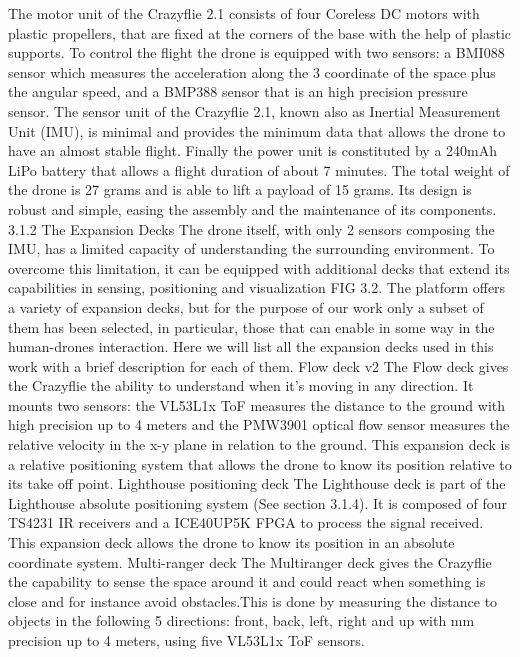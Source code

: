 The motor unit of the Crazyflie 2.1 consists of four Coreless DC motors with plastic propellers, that are fixed at the corners of the base with the help of plastic supports.
To control the flight the drone is equipped with two sensors: a BMI088 sensor which measures the acceleration along the 3 coordinate of the space plus the angular speed, and a BMP388 sensor that is an high precision pressure sensor. 
The sensor unit of the Crazyflie 2.1, known also as Inertial Measurement Unit (IMU), is minimal and provides the minimum data that allows the drone to have an almost stable flight.
Finally the power unit is constituted by a 240mAh LiPo battery that allows a flight duration of about 7 minutes. The total weight of the drone is 27 grams and is able to lift a payload of 15 grams. Its design is robust and simple, easing the assembly and the maintenance of its components.
3.1.2 The Expansion Decks
The drone itself, with only 2 sensors composing the IMU, has a limited capacity of understanding the surrounding environment. To overcome this limitation, it can be equipped with additional decks that extend its capabilities in sensing, positioning and visualization {FIG 3.2}. The platform offers a variety of expansion decks, but for the purpose of our work only a subset of them has been selected, in particular, those that can enable in some way in the human-drones interaction. Here we will list all the expansion decks used in this work with a brief description for each of them.
Flow deck v2
The Flow deck gives the Crazyflie the ability to understand when it’s moving in any direction. It mounts two sensors: the VL53L1x ToF measures the distance to the ground with high precision up to 4 meters and the PMW3901 optical flow sensor measures the relative velocity in the x-y plane in relation to the ground. This expansion deck is a relative positioning system that allows the drone to know its position relative to its take off point.
Lighthouse positioning deck
The Lighthouse deck is part of the Lighthouse absolute positioning system (See section 3.1.4). It is composed of four TS4231 IR receivers and a ICE40UP5K FPGA to process the signal received. This expansion deck allows the drone to know its position in an absolute coordinate system.
Multi-ranger deck
The Multiranger deck gives the Crazyflie the capability to sense the space around it and could react when something is close and for instance avoid obstacles.This is done by measuring the distance to objects in the following 5 directions: front, back, left, right and up with mm precision up to 4 meters, using five VL53L1x ToF sensors.
